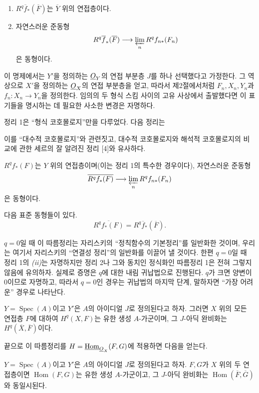 \begin{enumerate}
  \item[\textit{i.}] $R^{q}\overline f_{*}(\overline F)$는
    $\overline Y$ 위의 연접층이다.
  \item[\textit{ii.}] 자연스러운 준동형
    \[
      R^{q}\overline f_{*}(\overline F)
      \longrightarrow \varprojlim_n R^{q}f_{n*}(F_n)
    \]
    은 동형이다.
\end{enumerate}

이 명제에서는 $Y'$을 정의하는 $\underline{O}_Y$의 연접 부분층 $J$를 하나
선택했다고 가정한다. 그 역상으로 $X'$을 정의하는 $\underline{O}_X$의 연접
부분층을 얻고, 따라서 제2절에서처럼 $F_n,X_n,Y_n$과
$f_n:X_n\longrightarrow Y_n$을 정의한다. 임의의 두 형식 스킴 사이의
고유 사상에서 출발했다면 이 표기들을 명시하는 데 필요한 사소한 변경은
자명하다.

정리 1은 ``형식 코호몰로지''만을 다루었다. 다음 정리는

이를 ``대수적 코호몰로지''와 관련짓고, 대수적 코호몰로지와 해석적
코호몰로지의 비교에 관한 세르의 잘 알려진 정리 [4]와 유사하다.

 $R^{q}f_{*}(F)$는 $Y$ 위의
연접층이며(이는 정리 1의 특수한 경우이다), 자연스러운 준동형
\[
  \overline{R^{q}f_{*}(F)}
  \longrightarrow \varprojlim_n R^{q}f_{n*}(F_n)
\]
은 동형이다.

 다음 표준 동형들이 있다.
\[
  \overline{R^{q}f_{*}(F)}=R^{q}\overline f_{*}(\overline F).
\]

$q=0$일 때 이 따름정리는 자리스키의 ``정칙함수의 기본정리''를 일반화한
것이며, 우리는 여기서 자리스키의 ``연결성 정리''의 일반화를 이끌어 낼
것이다. 한편 $q=0$일 때 정리 1의 \textit{(ii)}는 자명하지만 정리 2나
그와 동치인 정식화인 따름정리 1은 전혀 그렇지 않음에 유의하자. 실제로
증명은 $q$에 대한 내림 귀납법으로 진행된다. $q$가 크면 양변이 0이므로
자명하고, 따라서 $q=0$인 경우는 귀납법의 마지막 단계, 말하자면 ``가장
어려운'' 경우로 나타난다.

 $Y=\operatorname{Spec}(A)$이고 $Y'$은 $A$의 아이디얼
$J$로 정의된다고 하자. 그러면 $X$ 위의 모든 연접층 $F$에 대하여
$H^{q}(X,F)$는 유한 생성 $A$-가군이며, 그 $J$-아딕 완비화는
$H^{q}(\overline X,\overline F)$이다.

끝으로 이 따름정리를
$H=\underline{\operatorname{Hom}}_{\underline{O}_X}(F,G)$에 적용하면 다음을 얻는다.

 $Y=\operatorname{Spec}(A)$이고 $Y'$은 $A$의 아이디얼
$J$로 정의된다고 하자. $F,G$가 $X$ 위의 두 연접층이면
$\operatorname{Hom}(F,G)$는 유한 생성 $A$-가군이고, 그 $J$-아딕
완비화는 $\operatorname{Hom}(\overline F,\overline G)$와 동일시된다.

